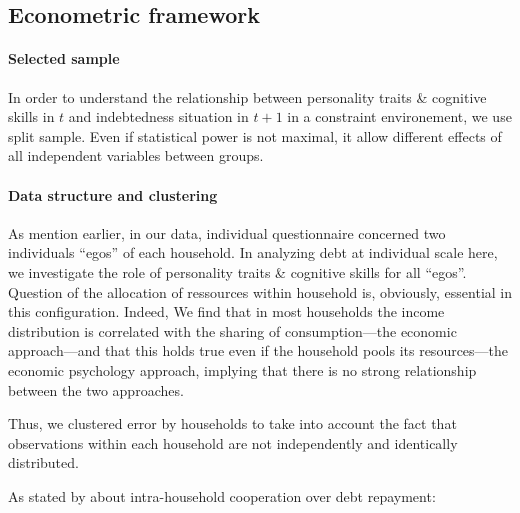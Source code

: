 \documentclass[a4paper, 11pt, onecolumn]{article}
\begin{document}
	\subsection{Econometric framework}

\paragraph{Selected sample}
In order to understand the relationship between personality traits \& cognitive skills in $t$ and indebtedness situation in $t+1$ in a constraint environement, we use split sample.
Even if statistical power is not maximal, it allow different effects of all independent variables between groups.

\paragraph{Data structure and clustering}
As mention earlier, in our data, individual questionnaire concerned two individuals ``egos'' of each household.
In analyzing debt at individual scale here, we investigate the role of personality traits \& cognitive skills for all ``egos''.
Question of the allocation of ressources within household is, obviously, essential in this configuration.
Indeed, \citep{Lazear1988}
\citep{Bonke2015} We find that in most households the income distribution is correlated with the sharing of consumption—the economic approach—and that this holds true even if the household pools its resources—the economic psychology approach, implying that there is no strong relationship between the two approaches.

Thus, we clustered error by households to take into account the fact that observations within each household are not independently and identically distributed.

As stated by \cite{Reboul2021} about intra-household cooperation over debt repayment:
\end{document}
